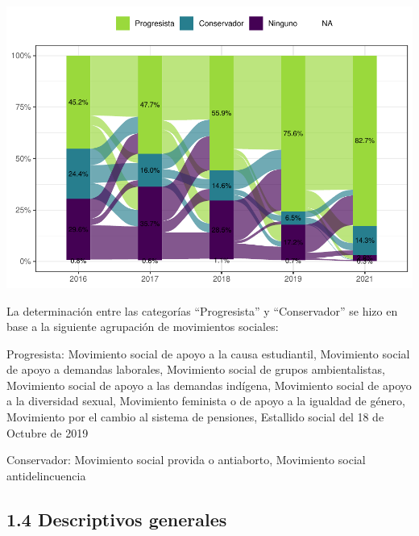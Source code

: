 \documentclass[
  12pt,
]{book}
\begin{document}
\includegraphics{reporte-elsoc_files/figure-latex/unnamed-chunk-8-1.pdf}

La determinación entre las categorías ``Progresista'' y ``Conservador'' se hizo en base a la siguiente agrupación de movimientos sociales:

Progresista: Movimiento social de apoyo a la causa estudiantil, Movimiento social de apoyo a demandas laborales, Movimiento social de grupos ambientalistas, Movimiento social de apoyo a las demandas indígena, Movimiento social de apoyo a la diversidad sexual, Movimiento feminista o de apoyo a la igualdad de género, Movimiento por el cambio al sistema de pensiones, Estallido social del 18 de Octubre de 2019

Conservador: Movimiento social provida o antiaborto, Movimiento social antidelincuencia

\hypertarget{descriptivos-generales}{%
\subsection{1.4 Descriptivos generales}\label{descriptivos-generales}}
\end{document}
